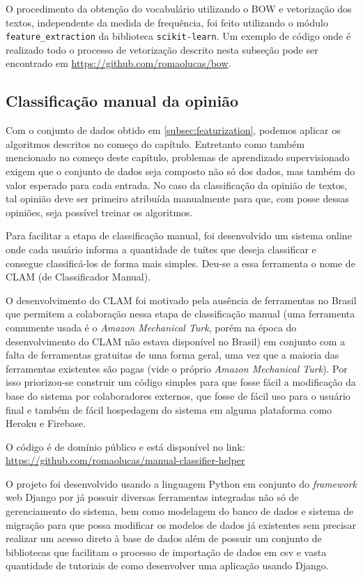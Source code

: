 O procedimento da obtenção do vocabulário utilizando o BOW e vetorização dos textos, independente da
medida de frequência, foi feito utilizando o módulo \texttt{feature_extraction} da biblioteca
\texttt{scikit-learn}. Um exemplo de código onde é realizado todo o processo de vetorização descrito
nesta subseção pode ser encontrado em \url{https://github.com/romaolucas/bow}.

\subsection{Classificação manual da opinião}

Com o conjunto de dados obtido em \ref{subsec:featurization}, podemos aplicar os algoritmos 
descritos no começo do capítulo. Entretanto como também mencionado no começo deste capítulo,
problemas de aprendizado supervisionado exigem que o conjunto de dados seja composto não só dos
dados, mas também do valor esperado para cada entrada. No caso da classificação da opinião de
textos, tal opinião deve ser primeiro atribuída manualmente para que, com posse dessas opiniões,
seja possível treinar os algoritmos.

Para facilitar a etapa de classificação manual, foi desenvolvido um sistema online onde cada usuário
informa a quantidade de tuítes que deseja classificar e consegue classificá-los de forma
mais simples. Deu-se a essa ferramenta o nome de CLAM (de Classificador Manual).

O desenvolvimento do CLAM foi motivado pela ausência de ferramentas no Brasil que permitem a
colaboração nessa etapa de classificação manual (uma ferramenta comumente usada é o \textit{Amazon
Mechanical Turk}, porém na época do desenvolvimento do CLAM não estava disponível no Brasil)
em conjunto com a falta de ferramentas gratuitas de 
uma forma geral, uma vez que a maioria das ferramentas existentes são pagas (vide o 
próprio \textit{Amazon Mechanical Turk}). Por isso priorizou-se construir um código simples
para que fosse fácil a modificação da base do sistema por colaboradores externos,
que fosse de fácil uso para o usuário final e também de fácil hospedagem do sistema
em alguma plataforma como Heroku e Firebase.

O código é de domínio público e está disponível no link:
 \url{https://github.com/romaolucas/manual-classifier-helper}

O projeto foi desenvolvido usando a linguagem Python em conjunto do \textit{framework} web
Django por já possuir diversas ferramentas integradas não só de gerenciamento do sistema, bem como
modelagem do banco de dados e sistema de migração para que possa modificar os modelos de dados já
existentes sem precisar realizar um acesso direto à base de dados além de possuir um conjunto
de bibliotecas que facilitam o processo de importação de dados em csv e vasta quantidade de 
tutoriais de como desenvolver uma aplicação usando Django.

